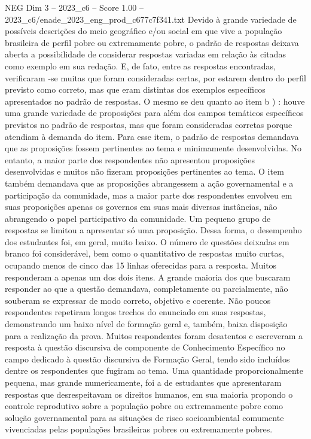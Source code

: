 \begin{textsample}{NEG Dim 3 – 2023\_c6 – Score 1.00 – 2023\_c6/enade\_2023\_eng\_prod\_c677c7f341.txt}
Devido à grande variedade de possíveis descrições do meio geográfico e/ou social em que vive a população brasileira de perfil pobre ou extremamente pobre, o padrão de respostas deixava aberta a possibilidade de considerar respostas variadas em relação às citadas como exemplo em sua redação.
E, de fato, entre as respostas encontradas, verificaram -se muitas que foram consideradas certas, por estarem dentro do perfil previsto como correto, mas que eram distintas dos exemplos específicos apresentados no padrão de respostas.
O mesmo se deu quanto ao item b ) : houve uma grande variedade de proposições para além dos campos temáticos específicos previstos no padrão de respostas, mas que foram consideradas corretas porque atendiam à demanda do item.
Para esse item, o padrão de respostas demandava que as proposições fossem pertinentes ao tema e minimamente desenvolvidas.
No entanto, a maior parte dos respondentes não apresentou proposições desenvolvidas e muitos não fizeram proposições pertinentes ao tema.
O item também demandava que as proposições abrangessem a ação governamental e a participação da comunidade, mas a maior parte dos respondentes envolveu em suas proposições apenas os governos em suas mais diversas instâncias, não abrangendo o papel participativo da comunidade.
Um pequeno grupo de respostas se limitou a apresentar só uma proposição.
Dessa forma, o desempenho dos estudantes foi, em geral, muito baixo.
O número de questões deixadas em branco foi considerável, bem como o quantitativo de respostas muito curtas, ocupando menos de cinco das 15 linhas oferecidas para a resposta.
Muitos responderam a apenas um dos dois itens.
A grande maioria dos que buscaram responder ao que a questão demandava, completamente ou parcialmente, não souberam se expressar de modo correto, objetivo e coerente.
Não poucos respondentes repetiram longos trechos do enunciado em suas respostas, demonstrando um baixo nível de formação geral e, também, baixa disposição para a realização da prova.
Muitos respondentes foram desatentos e escreveram a resposta à questão discursiva de componente de Conhecimento Específico no campo dedicado à questão discursiva de Formação Geral, tendo sido incluídos dentre os respondentes que fugiram ao tema.
Uma quantidade proporcionalmente pequena, mas grande numericamente, foi a de estudantes que apresentaram respostas que desrespeitavam os direitos humanos, em sua maioria propondo o controle reprodutivo sobre a população pobre ou extremamente pobre como solução governamental para as situações de risco socioambiental comumente vivenciadas pelas populações brasileiras pobres ou extremamente pobres.

\end{textsample}

